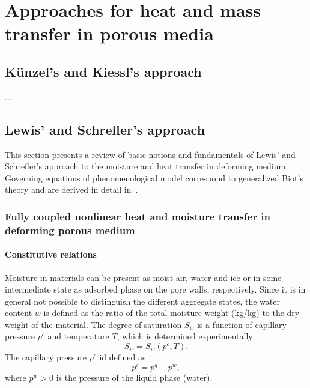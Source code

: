 \chapter{Approaches for heat and mass transfer in porous media}
\label{approaches}


\section{K\"unzel's and Kiessl's approach}
\label{kunzelkiessl}

...

\section{Lewis' and Schrefler's approach}
\label{seclewisschrefler}

This section presents a review of basic notions and fundamentals of Lewis' and Schrefler's approach to the moisture and heat transfer in deforming medium. 
Governing equations of phenomenological model correspond to generalized Biot's theory and are derived in detail in~\cite{lewis}.

\subsection{Fully coupled nonlinear heat and moisture transfer in deforming porous medium}
\subsubsection{Constitutive relations}

Moisture in materials can be present as moist air, water and ice or in some intermediate state as adsorbed phase 
on the pore walls, respectively. Since it is in general not possible to distinguish the different aggregate states, 
the water content $w$ is defined as the ratio of the total moisture weight (kg/kg) to the dry weight of the material. 
The degree of saturation $S_w$ is a function of capillary pressure $p^c$ and temperature $T$, 
which is determined experimentally
\begin{equation}\label{Sw}
S_w = S_w(p^c,T).
\end{equation}
The capillary pressure $p^c$ id defined as
\begin{equation}\label{pc}
p^c = p^g - p^w,
\end{equation}
where $p^w > 0$ is the pressure of the liquid phase (water). 

